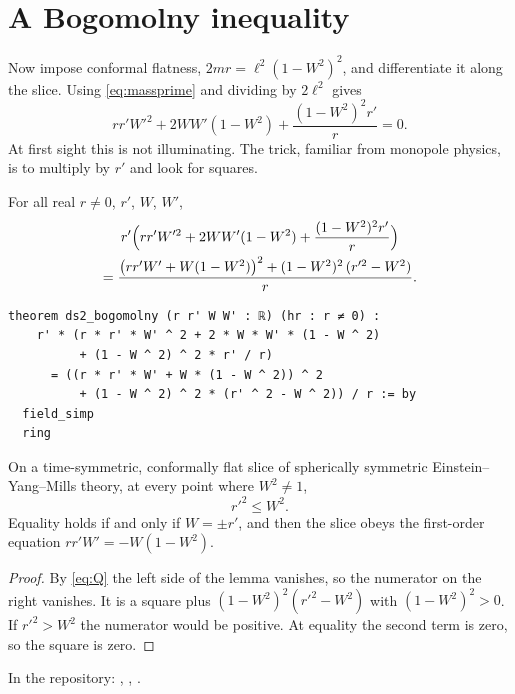 \section{A Bogomolny inequality}

Now impose conformal flatness, $2mr=\ell^2(1-W^2)^2$, and differentiate it along the slice. Using \eqref{eq:massprime} and dividing by $2\ell^2$ gives
\begin{equation}\label{eq:Q}
r r' W'^2 + 2WW'(1-W^2) + \frac{(1-W^2)^2 r'}{r}=0 .
\end{equation}
At first sight this is not illuminating. The trick, familiar from monopole physics, is to multiply by $r'$ and look for squares.

\begin{lemma}\proved
For all real $r\ne0$, $r'$, $W$, $W'$,
\begin{multline*}
r'\Bigl(rr'W'^2+2WW'(1-W^2)+\frac{(1-W^2)^2r'}{r}\Bigr)\\
=\frac{\bigl(rr'W'+W(1-W^2)\bigr)^2+(1-W^2)^2\,(r'^2-W^2)}{r}.
\end{multline*}
\end{lemma}

\begin{leanbox}
\begin{Verbatim}[fontsize=\small]
theorem ds2_bogomolny (r r' W W' : ℝ) (hr : r ≠ 0) :
    r' * (r * r' * W' ^ 2 + 2 * W * W' * (1 - W ^ 2)
          + (1 - W ^ 2) ^ 2 * r' / r)
      = ((r * r' * W' + W * (1 - W ^ 2)) ^ 2
          + (1 - W ^ 2) ^ 2 * (r' ^ 2 - W ^ 2)) / r := by
  field_simp
  ring
\end{Verbatim}
\end{leanbox}

\begin{theorem}\proved\label{thm:bog}
On a time-symmetric, conformally flat slice of spherically symmetric Einstein--Yang--Mills theory, at every point where $W^2\ne1$,
\[
r'^2\le W^2 .
\]
Equality holds if and only if $W=\pm r'$, and then the slice obeys the first-order equation $rr'W'=-W(1-W^2)$.
\end{theorem}

\begin{proof}
By \eqref{eq:Q} the left side of the lemma vanishes, so the numerator on the right vanishes. It is a square plus $(1-W^2)^2(r'^2-W^2)$ with $(1-W^2)^2>0$. If $r'^2>W^2$ the numerator would be positive. At equality the second term is zero, so the square is zero.
\end{proof}
\noindent In the repository: , , .


